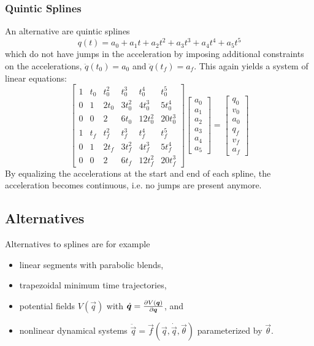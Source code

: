 			\subsubsection{Quintic Splines}
				An alternative are quintic splines
				\begin{equation*}
					q(t) = a_0 + a_1 t + a_2 t^2 + a_3 t^3 + a_4 t^4 + a_5 t^5
				\end{equation*}
				which do not have jumps in the acceleration by imposing additional constraints on the accelerations, \( \ddot{q}(t_0) = a_0 \) and \( \ddot{q}(t_f) = a_f \). This again yields a system of linear equations:
				\begin{equation*}
					\begin{bmatrix}
						1 & t_0 & t_0^2 & t_0^3   & t_0^4    & t_0^5    \\
						0 & 1   & 2 t_0 & 3 t_0^2 & 4 t_0^3  & 5 t_0^4  \\
						0 & 0   & 2     & 6 t_0   & 12 t_0^2 & 20 t_0^3 \\
						1 & t_f & t_f^2 & t_f^3   & t_f^4    & t_f^5    \\
						0 & 1   & 2 t_f & 3 t_f^2 & 4 t_f^3  & 5 t_f^4  \\
						0 & 0   & 2     & 6 t_f   & 12 t_f^2 & 20 t_f^3
					\end{bmatrix}
					\begin{bmatrix}
						a_0 \\
						a_1 \\
						a_2 \\
						a_3 \\
						a_4 \\
						a_5
					\end{bmatrix}
					=
					\begin{bmatrix}
						q_0 \\
						v_0 \\
						a_0 \\
						q_f \\
						v_f \\
						a_f
					\end{bmatrix}
				\end{equation*}
				By equalizing the accelerations at the start and end of each spline, the acceleration becomes continuous, i.e. no jumps are present anymore.

		\subsection{Alternatives}
			Alternatives to splines are for example
			\begin{itemize}
				\item linear segments with parabolic blends,
				\item trapezoidal minimum time trajectories,
				\item potential fields \( V(\vec{q}) \) with \( \dot{\bm{q}} = \pdv{V(\bm{q})}{\bm{q}} \), and
				\item nonlinear dynamical systems \( \ddot{\vec{q}} = \vec{f}(\vec{q}, \dot{\vec{q}}, \vec{\theta}) \) parameterized by \(\vec{\theta}\).
			\end{itemize}

